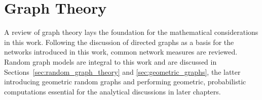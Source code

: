 \chapter{Graph Theory}\label{ch:Graph_theory} 

A review of graph theory lays the foundation for the mathematical
considerations in this work. Following the discussion of directed
graphs as a basis for the networks introduced in this work, common network
measures are reviewed. Random graph models are integral to this work and are
discussed in Sections~\ref{sec:random_graph_theory} and
\ref{sec:geometric_graphs}, the latter introducing geometric random
graphs and performing geometric, probabilistic computations essential
for the analytical discussions in later chapters. 





% 
% 
% 















% 





